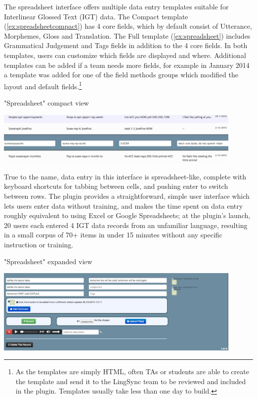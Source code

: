 \documentclass[letterpaper, 12pt, dvips]{mitwpl}
\begin{document}
 The spreadsheet interface offers multiple data entry templates suitable for  Interlinear Glossed Text (IGT) data. The Compact template (\ref{ex:spreadsheetcompact}) has 4 core fields, which by default consist of Utterance, Morphemes, Gloss and Translation. The Full template  (\ref{ex:spreadsheet}) includes Grammatical Judgement and Tags fields in addition to the 4 core fields. In both templates, users can customize which fields are displayed and where. Additional templates can be added if a team needs more fields, for example in January 2014 a template was added for one of the field methods groups which modified the layout and default fields.\footnote{As the templates are simply HTML, often TAs or students are able to create the template and send it to the LingSync team to be reviewed and included in the plugin. Templates usually take less than one day to build.} 
 
 \begin{exe} 
\ex "Spreadsheet" compact view \\

 \begin{center}
   \includegraphics[width=0.9\textwidth]{spreadsheetcompact}
 \end{center}
 
\label{ex:spreadsheetcompact}
\end{exe} 

True to the name, data entry in this interface is spreadsheet-like, complete with keyboard shortcuts for tabbing between cells, and pushing enter to switch between rows.  The plugin provides a straightforward, simple user interface which lets users enter data without training, and makes the time spent on data entry roughly equivalent to using Excel or Google Spreadsheets; at the plugin's launch, 20 users each entered 4 IGT data records from an unfamiliar language, resulting in a small corpus of 70+ items in under 15 minutes without any specific instruction or training.  

 
\begin{exe} 
\ex "Spreadsheet" expanded view\\

  \begin{center}
   \includegraphics[width=0.9\textwidth]{spreadsheetinterface}
   \end{center}

\label{ex:spreadsheet}
\end{exe} 
\end{document}
